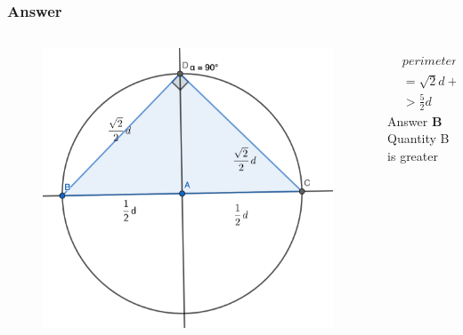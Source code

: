 \documentclass[
	11pt, %
]{beamer}
\begin{document}
\begin{frame}
	\frametitle{Answer}
	\begin{columns}[t] 

		\begin{column}{0.5\textwidth} %
			\begin{figure}
				\includegraphics[width=\linewidth]{Inscribe_Example_Question1_1.png}
			\end{figure}
		\end{column}

		\begin{column}{0.5\textwidth} %
			\begin{equation*}
				\begin{aligned}
					&perimeter = \frac{\sqrt{2}}{2}d + \frac{\sqrt{2}}{2}d + d\\
					&=\sqrt{2}d + d \\
					&>\frac{5}{2}d
				\end{aligned}
			\end{equation*}	
		  Answer \textbf{B} Quantity B is greater
		\end{column}

	\end{columns}
\end{frame}

\end{document}
